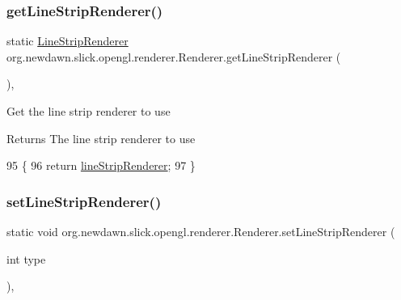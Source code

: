 \subsubsection{\texorpdfstring{get\+Line\+Strip\+Renderer()}{getLineStripRenderer()}}
{\footnotesize\ttfamily static \mbox{\hyperlink{interfaceorg_1_1newdawn_1_1slick_1_1opengl_1_1renderer_1_1_line_strip_renderer}{Line\+Strip\+Renderer}} org.\+newdawn.\+slick.\+opengl.\+renderer.\+Renderer.\+get\+Line\+Strip\+Renderer (\begin{DoxyParamCaption}{ }\end{DoxyParamCaption})\hspace{0.3cm}{\ttfamily [inline]}, {\ttfamily [static]}}

Get the line strip renderer to use

\begin{DoxyReturn}{Returns}
The line strip renderer to use 
\end{DoxyReturn}

\begin{DoxyCode}
95                                                            \{
96         \textcolor{keywordflow}{return} \mbox{\hyperlink{classorg_1_1newdawn_1_1slick_1_1opengl_1_1renderer_1_1_renderer_ad67da40e0608a905d1d28ae6f029e293}{lineStripRenderer}};
97     \}
\end{DoxyCode}
\mbox{\label{classorg_1_1newdawn_1_1slick_1_1opengl_1_1renderer_1_1_renderer_ad7172b7f319fc169ed3bbd2cab844b64}} 
\subsubsection{\texorpdfstring{set\+Line\+Strip\+Renderer()}{setLineStripRenderer()}\hspace{0.1cm}{\footnotesize\ttfamily [1/2]}}
{\footnotesize\ttfamily static void org.\+newdawn.\+slick.\+opengl.\+renderer.\+Renderer.\+set\+Line\+Strip\+Renderer (\begin{DoxyParamCaption}\item[{int}]{type }\end{DoxyParamCaption})\hspace{0.3cm}{\ttfamily [inline]}, {\ttfamily [static]}}


